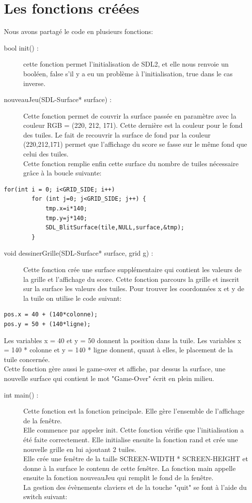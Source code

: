 \documentclass{report}
\begin{document}
\section{Les fonctions créées}
Nous avons partagé le code en plusieurs fonctions:
\begin{description}
\item[bool init() :] cette fonction permet l'initialisation de SDL2, et elle nous renvoie un booléen, false s'il y a eu un problème à l'initialisation, true dans le cas inverse.
\item[nouveauJeu(SDL-Surface* surface) :] Cette fonction permet de couvrir la surface passée en paramètre avec la couleur RGB = (220, 212, 171). Cette dernière est la couleur pour le fond des tuiles. Le fait de recouvrir la surface de fond par la couleur (220,212,171) permet que l'affichage du score se fasse sur le même fond que celui des tuiles.\\
Cette fonction remplie enfin cette surface du nombre de tuiles nécessaire grâce à la boucle suivante:
\end{description}
\begin{lstlisting}[frame=single]
for(int i = 0; i<GRID_SIDE; i++)
        for (int j=0; j<GRID_SIDE; j++) {
            tmp.x=i*140;
            tmp.y=j*140;
            SDL_BlitSurface(tile,NULL,surface,&tmp);
        }
\end{lstlisting}
\begin{description}
\item[void dessinerGrille(SDL-Surface* surface, grid g) :] Cette fonction crée une surface supplémentaire qui contient les valeurs de la grille et l'affichage du score. Cette fonction  parcours la grille et inscrit sur la surface les valeurs des tuiles. Pour trouver les coordonnées x et y de la tuile on utilise le code suivant:
\end{description}
\begin{lstlisting}[frame=single]
pos.x = 40 + (140*colonne);
pos.y = 50 + (140*ligne);
\end{lstlisting}
Les variables x = 40 et y = 50 donnent la position dans la tuile. Les variables x = 140 * colonne et y = 140 * ligne donnent, quant à elles, le placement de la tuile concernée.\\
Cette fonction gère aussi le game-over et affiche, par dessus la surface, une nouvelle surface qui contient le mot "Game-Over" écrit en plein milieu.
\begin{description}
\item[int main() :] Cette fonction est la fonction principale. Elle gère l'ensemble de l'affichage de la fenêtre.\\
Elle commence par appeler init. Cette fonction vérifie que l'initialisation a été faite correctement. Elle initialise ensuite la fonction rand et crée une nouvelle grille en lui ajoutant 2 tuiles.\\
Elle crée une fenêtre de la taille SCREEN-WIDTH * SCREEN-HEIGHT et donne à la surface le contenu de cette fenêtre. La fonction main appelle ensuite la fonction nouveauJeu qui remplit le fond de la fenêtre.\\
La gestion des évènements claviers et de la touche "quit"  se font à l'aide du switch suivant:
\end{description}
\end{document}
